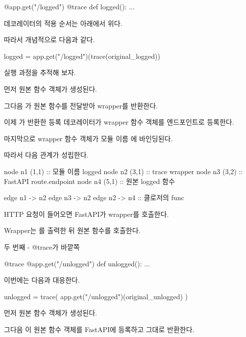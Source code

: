 \begin{dhkcode}
@app.get("/logged")
@trace
def logged():
    ...
\end{dhkcode}

데코레이터의 적용 순서는 아래에서 위다.

따라서 개념적으로 다음과 같다.

\begin{dhkcode}
logged = app.get("/logged")(trace(original_logged))
\end{dhkcode}

실행 과정을 추적해 보자.

먼저 원본  함수 객체가 생성된다.

그다음 가 원본 함수를 전달받아 wrapper를 반환한다.

이제 가 반환한 등록 데코레이터가 wrapper 함수 객체를 엔드포인트로 등록한다.

마지막으로 wrapper 함수 객체가 모듈 이름 에 바인딩된다.

따라서 다음 관계가 성립한다.

\begin{dhkdiagram}[in=2]
node n1 (1,1) :: 모듈 이름 logged
node n2 (3,1) :: trace wrapper
node n3 (3,2) :: FastAPI route.endpoint
node n4 (5,1) :: 원본 logged 함수

edge n1 -> n2
edge n3 -> n2
edge n2 -> n4 :: 클로저의 func
\end{dhkdiagram}

HTTP 요청이 들어오면 FastAPI가 wrapper를 호출한다.

Wrapper는 를 출력한 뒤 원본 함수를 호출한다.

\begin{dhknote}
\begin{dhksmry}[centered]
두 번째 - @trace가 바깥쪽
\end{dhksmry}
\end{dhknote}

\begin{dhkcode}
@trace
@app.get("/unlogged")
def unlogged():
    ...
\end{dhkcode}

이번에는 다음과 대응한다.

\begin{dhkcode}
unlogged = trace(
    app.get("/unlogged")(original_unlogged)
)
\end{dhkcode}

먼저 원본 함수 객체가 생성된다.

그다음 이 원본 함수 객체를 FastAPI에 등록하고 그대로 반환한다.

